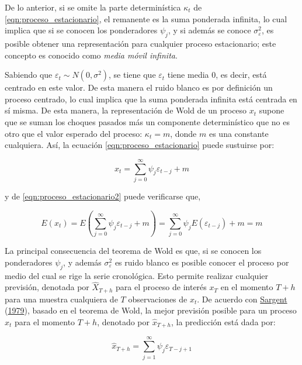\documentclass[
]{article}
\begin{document}
De lo anterior, si se omite la parte determinística \(\kappa_t\) de
\ref{eqn:proceso_estacionario}, el remanente es la suma ponderada
infinita, lo cual implica que si se conocen los ponderadores \(\psi_j\),
y si además se conoce \(\sigma_\varepsilon^2\), es posible obtener una
representación para cualquier proceso estacionario; este concepto es
conocido como \emph{media móvil infinita}.

Sabiendo que \(\varepsilon_t \sim N(0, \sigma^2)\), se tiene que
\(\varepsilon_t\) tiene media 0, es decir, está centrado en este valor.
De esta manera el ruido blanco es por definición un proceso centrado, lo
cual implica que la suma ponderada infinita está centrada en sí misma.
De esta manera, la representación de Wold de un proceso \(x_t\) supone
que se suman los choques pasados más un componente determinístico que no
es otro que el valor esperado del proceso: \(\kappa_t=m\), donde \(m\)
es una constante cualquiera. Así, la ecuación
\ref{eqn:proceso_estacionario} puede sustuirse por:

\begin{equation}
\label{eqn:proceso_estacionario2}
x_t=\sum_{j=0}^{\infty} \psi_j\varepsilon_{t-j}+m
\end{equation}

y de \ref{eqn:proceso_estacionario2} puede verificarse que,

\begin{equation}
\label{eqn:dem_proceso_estacionario2}
E(x_t)=E\left(\sum_{j=0}^{\infty} \psi_j\varepsilon_{t-j}+m\right)=\sum_{j=0}^{\infty} \psi_jE\left(\varepsilon_{t-j}\right) + m = m
\end{equation}

La principal consecuencia del teorema de Wold es que, si se conocen los
ponderadores \(\psi_j\), y además \(\sigma_\varepsilon^2\) es ruido
blanco es posible conocer el proceso por medio del cual se rige la serie
cronológica. Esto permite realizar cualquier previsión, denotada por
\(\hat X_{T+h}\) para el proceso de interés \(x_T\) en el momento
\(T+h\) para una muestra cualquiera de \(T\) observaciones de \(x_t\).
De acuerdo con \protect\hyperlink{ref-sargent_macro}{Sargent}
(\protect\hyperlink{ref-sargent_macro}{1979}), basado en el teorema de
Wold, la mejor previsión posible para un proceso \(x_t\) para el momento
\(T+h\), denotado por \(\hat x_{T+h}\), la predicción está dada por:

\begin{equation}
\label{eqn:prevision}
\hat x_{T+h}=\sum_{j=1}^{\infty} \psi_j \varepsilon_{T-j+1}
\end{equation}
\end{document}
